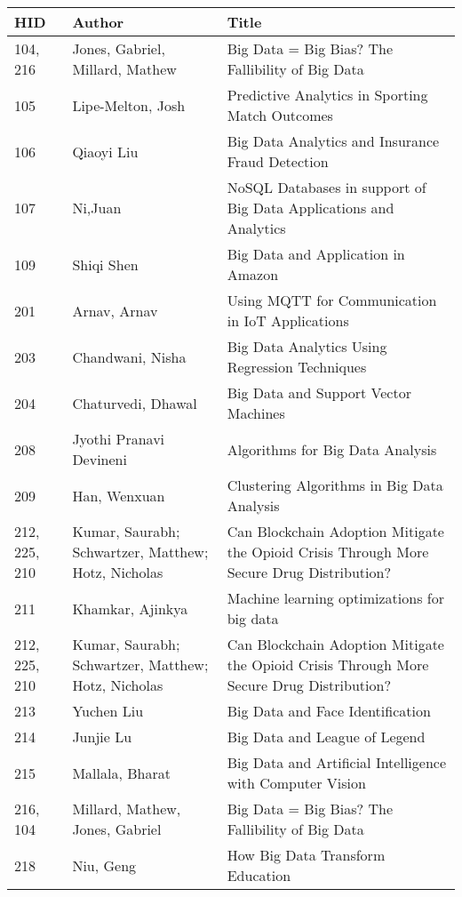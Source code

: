 \documentclass[12pt]{book}
\begin{document}
\begin{footnotesize}
\begin{longtable}{|p{1cm}p{5cm}p{9cm}|}
\hline \textbf{HID} & \textbf{Author} & \textbf{Title} \\ \hline \hline

\hline
\hline
104, 216 & Jones, Gabriel, Millard, Mathew & Big Data = Big Bias? The Fallibility of Big Data  \\
\hline
105 & Lipe-Melton, Josh & Predictive Analytics in Sporting Match Outcomes  \\
\hline
106 & Qiaoyi Liu & Big Data Analytics and Insurance Fraud Detection  \\
\hline
107 & Ni,Juan & NoSQL Databases in support of Big Data Applications and Analytics  \\
\hline
109 & Shiqi Shen & Big Data and Application in Amazon  \\
\hline
201 & Arnav, Arnav & Using MQTT for Communication in IoT Applications  \\
\hline
\hline
203 & Chandwani, Nisha & Big Data Analytics Using Regression Techniques  \\
\hline
204 & Chaturvedi, Dhawal & Big Data and Support Vector Machines  \\
\hline
\hline
208 & Jyothi Pranavi Devineni & Algorithms for Big Data Analysis  \\
\hline
209 & Han, Wenxuan & Clustering Algorithms in Big Data Analysis  \\
\hline
212, 225, 210 & Kumar, Saurabh; Schwartzer, Matthew; Hotz, Nicholas & Can Blockchain Adoption Mitigate the Opioid Crisis Through More Secure Drug Distribution?
  \\
\hline
211 & Khamkar, Ajinkya & Machine learning optimizations for big data  \\
\hline
212, 225, 210 & Kumar, Saurabh; Schwartzer, Matthew; Hotz, Nicholas & Can Blockchain Adoption Mitigate the Opioid Crisis Through More Secure Drug Distribution?  \\
\hline
213 & Yuchen Liu & Big Data and Face Identification  \\
\hline
214 & Junjie Lu & Big Data and League of Legend  \\
\hline
215 & Mallala, Bharat & Big Data and Artificial Intelligence with Computer Vision  \\
\hline
216, 104 & Millard, Mathew, Jones, Gabriel & Big Data = Big Bias? The Fallibility of Big Data  \\
\hline
218 & Niu, Geng & How Big Data Transform Education  \\

\end{longtable}
\end{footnotesize}
\end{document}
